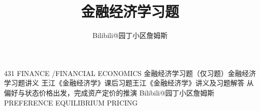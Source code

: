 \documentclass[fontset=none]{exam-zh}
\title{金融经济学习题}
\author{Bilibili@园丁小区詹姆斯}
\begin{document}
\FourThreeOneFrontMatter

\ifdefined\FourThreeOnePrintInterior
\else
\MakeFourThreeOneCover
    {431 FINANCE \quad/\quad FINANCIAL ECONOMICS}
    {\ifdefined\WJExercisesOnly 金融经济学习题（仅习题）\else 金融经济学习题讲义\fi}
    {\ifdefined\WJExercisesOnly 王江《金融经济学》课后习题\else 王江《金融经济学》讲义及习题解答\fi}
    {从偏好与状态价格出发，完成资产定价的推演}
    {Bilibili@园丁小区詹姆斯}
    {PREFERENCE \quad EQUILIBRIUM \quad PRICING}

\null
\thispagestyle{empty}
\fi

\MakeFourThreeOneContents[2]

\cleardoublepage

\setcounter{chapter}{1}














\end{document}

